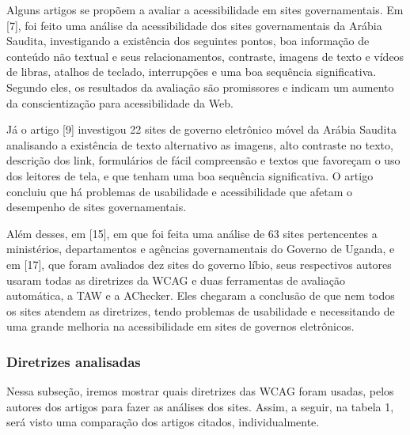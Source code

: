 \documentclass[a4paper]{article}
\begin{document}
\begin{titlepage}
Alguns artigos se propõem a avaliar a acessibilidade em sites governamentais. Em [7], foi feito uma análise da acessibilidade dos sites governamentais da Arábia Saudita, investigando a existência dos seguintes pontos, boa informação de conteúdo não textual e seus relacionamentos, contraste, imagens de texto e vídeos de libras, atalhos de teclado, interrupções e uma boa sequência significativa. Segundo eles, os resultados da avaliação são promissores e indicam um aumento da conscientização para acessibilidade da Web.

Já o artigo [9] investigou 22 sites de governo eletrônico móvel da Arábia Saudita analisando a existência de texto alternativo as imagens, alto contraste no texto, descrição dos link, formulários de fácil compreensão e textos que favoreçam o uso dos leitores de tela, e que tenham uma boa sequência significativa. O artigo concluiu que há problemas de usabilidade e acessibilidade que afetam o desempenho de sites governamentais.

Além desses, em [15], em que foi feita uma análise de 63 sites pertencentes a ministérios, departamentos e agências governamentais do Governo de Uganda, e em [17], que foram avaliados dez sites do governo líbio, seus respectivos autores usaram todas as diretrizes da WCAG e duas ferramentas de avaliação automática, a TAW e a AChecker. Eles chegaram a conclusão de que nem todos os sites atendem as diretrizes, tendo problemas de usabilidade e necessitando de uma grande melhoria na acessibilidade em sites de governos eletrônicos.

\subsubsection{Diretrizes analisadas}

Nessa subseção, iremos mostrar quais diretrizes das WCAG foram usadas, pelos autores dos artigos para fazer as análises dos sites. Assim, a seguir, na tabela 1, será visto uma comparação dos artigos citados, individualmente.\\


\end{titlepage}
\end{document}
